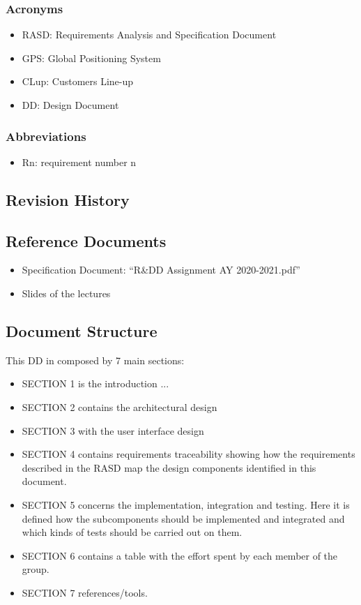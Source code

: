 		\subsubsection{Acronyms}
		\begin{itemize}
			\item \textcolor{BrickRed}{RASD}: Requirements Analysis and Specification Document 
			\item \textcolor{BrickRed}{GPS}: Global Positioning System
			\item \textcolor{BrickRed}{CLup}: Customers Line-up
			\item \textcolor{BrickRed}{DD}: Design Document 
		\end{itemize}
		
		\subsubsection{Abbreviations}
		\begin{itemize}
			\item \textcolor{BrickRed}{Rn}: requirement number n
		\end{itemize}
		
	\subsection{Revision History}
	
	\subsection{Reference Documents}
	\begin{itemize}
			\item \textcolor{BrickRed}{Specification Document}: “R\&DD Assignment AY 2020-2021.pdf”
			\item \textcolor{BrickRed}{Slides of the lectures}
	\end{itemize}
		
	\subsection{Document Structure}
	This DD in composed by 7 main sections:
	\begin {itemize}
	 	\item SECTION 1 is the introduction ...
		\item SECTION 2 contains the architectural design
		\item SECTION 3 with the user interface design
		\item SECTION 4 contains requirements traceability showing how the requirements described in the RASD map the design components identified in this document.
		\item SECTION 5 concerns the implementation, integration and testing. Here it is defined how the subcomponents should be implemented and integrated and which kinds of tests should be carried out on them.
		\item SECTION 6 contains a table with the effort spent by each member of the group.
		\item SECTION 7 references/tools.
	\end{itemize}
	

